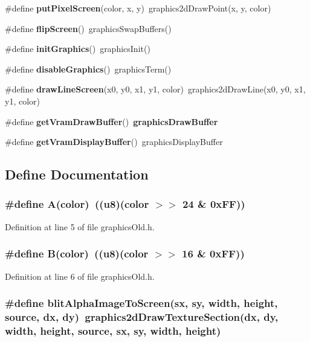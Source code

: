 \begin{CompactItemize}
\item 
\#define {\bf put\-Pixel\-Screen}(color, x, y)~graphics2d\-Draw\-Point(x, y, color)
\item 
\#define {\bf flip\-Screen}()~graphics\-Swap\-Buffers()
\item 
\#define {\bf init\-Graphics}()~graphics\-Init()
\item 
\#define {\bf disable\-Graphics}()~graphics\-Term()
\item 
\#define {\bf draw\-Line\-Screen}(x0, y0, x1, y1, color)~graphics2d\-Draw\-Line(x0, y0, x1, y1, color)
\item 
\#define {\bf get\-Vram\-Draw\-Buffer}()~{\bf graphics\-Draw\-Buffer}
\item 
\#define {\bf get\-Vram\-Display\-Buffer}()~graphics\-Display\-Buffer
\end{CompactItemize}


\subsection{Define Documentation}
\subsubsection{\setlength{\rightskip}{0pt plus 5cm}\#define A(color)~((u8)(color $>$$>$ 24 \& 0x\-FF))}\label{graphicsOld_8h_bed7f16f971412916fead0bf2c0f62d9}




Definition at line 5 of file graphics\-Old.h.
\subsubsection{\setlength{\rightskip}{0pt plus 5cm}\#define B(color)~((u8)(color $>$$>$ 16 \& 0x\-FF))}\label{graphicsOld_8h_934a37224d883fbf98cc009c755bd712}




Definition at line 6 of file graphics\-Old.h.
\subsubsection{\setlength{\rightskip}{0pt plus 5cm}\#define blit\-Alpha\-Image\-To\-Screen(sx, sy, width, height, source, dx, dy)~graphics2d\-Draw\-Texture\-Section(dx, dy, width, height, source, sx, sy, width, height)}\label{graphicsOld_8h_55e6ad8db7b8d1df725f927084c19aa2}




